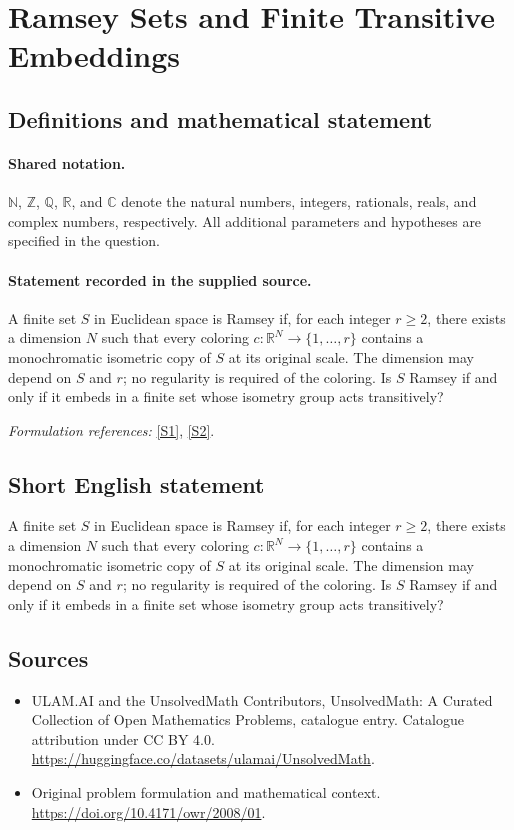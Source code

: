 \documentclass[11pt]{article}
\newcommand{\sref}[2]{\hyperlink{source:#1:#2}{[S#2]}}
\begin{document}
\section{Ramsey Sets and Finite Transitive Embeddings}\label{statement}

\subsection{Definitions and mathematical statement}

\paragraph{Shared notation.}$\mathbb N$, $\mathbb Z$, $\mathbb Q$, $\mathbb R$, and $\mathbb C$ denote the natural numbers, integers, rationals, reals, and complex numbers, respectively. All additional parameters and hypotheses are specified in the question.


\paragraph{Statement recorded in the supplied source.}
A finite set $S$ in Euclidean space is Ramsey if, for each integer $r\ge2$, there exists a dimension $N$ such that every coloring $c:\mathbb R^N\to\{1,\ldots,r\}$ contains a monochromatic isometric copy of $S$ at its original scale. The dimension may depend on $S$ and $r$; no regularity is required of the coloring. Is $S$ Ramsey if and only if it embeds in a finite set whose isometry group acts transitively?
\par\smallskip\textit{Formulation references:} \sref{statement}{1}, \sref{statement}{2}.
\subsection{Short English statement}
A finite set $S$ in Euclidean space is Ramsey if, for each integer $r\ge2$, there exists a dimension $N$ such that every coloring $c:\mathbb R^N\to\{1,\ldots,r\}$ contains a monochromatic isometric copy of $S$ at its original scale. The dimension may depend on $S$ and $r$; no regularity is required of the coloring. Is $S$ Ramsey if and only if it embeds in a finite set whose isometry group acts transitively?
\subsection{Sources}
\begin{itemize}
\item[\hypertarget{source:statement:1}{S1}] ULAM.AI and the UnsolvedMath Contributors, UnsolvedMath: A Curated Collection of Open Mathematics Problems, catalogue entry. Catalogue attribution under CC BY 4.0.
\url{https://huggingface.co/datasets/ulamai/UnsolvedMath}.
\item[\hypertarget{source:statement:2}{S2}] Original problem formulation and mathematical context.
\url{https://doi.org/10.4171/owr/2008/01}.
\end{itemize}
\label{end:statement}
\end{document}
